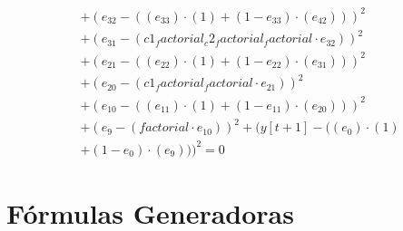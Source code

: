 \documentclass[10pt, a4paper]{article}
\begin{document}
\begin{align*}
& + (e_{32} - ((e_{33})  \cdot  (1) + (1 - e_{33})  \cdot  (e_{42})))^{2} \\
& + (e_{31} - (c1_factorial_c2_factorial_factorial  \cdot  e_{32}))^{2} \\
& + (e_{21} - ((e_{22})  \cdot  (1) + (1 - e_{22})  \cdot  (e_{31})))^{2} \\
& + (e_{20} - (c1_factorial_factorial  \cdot  e_{21}))^{2} \\
& + (e_{10} - ((e_{11})  \cdot  (1) + (1 - e_{11})  \cdot  (e_{20})))^{2} \\
& + (e_{9} - (factorial  \cdot  e_{10}))^{2} + (y[t+1] - ((e_{0})  \cdot  (1) \\
& + (1 - e_{0})  \cdot  (e_{9})))^{2} = 0
\end{align*}\part{Fórmulas Generadoras}
\end{document}
